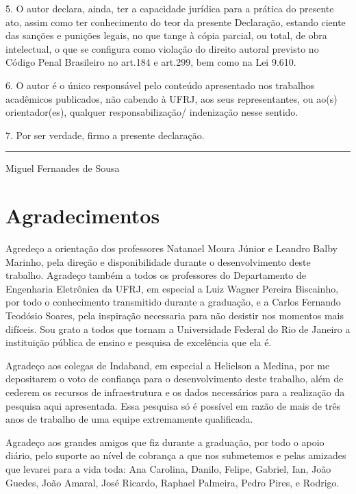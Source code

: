\documentclass[tcc,numbers]{coppe}
\begin{document}
5. O autor declara, ainda, ter a capacidade jurídica para a prática do presente
ato, assim como ter conhecimento do teor da presente Declaração, estando ciente
das sanções e punições legais, no que tange à cópia parcial, ou total, de obra
intelectual, o que se configura como violação do direito autoral previsto no
Código Penal Brasileiro no art.184 e art.299, bem como na Lei 9.610.

6. O autor é o único responsável pelo conteúdo apresentado nos trabalhos
acadêmicos publicados, não cabendo à UFRJ, aos seus representantes, ou ao(s)
orientador(es), qualquer responsabilização/ indenização nesse sentido.

7. Por ser verdade, firmo a presente declaração.

\vspace{4\baselineskip}

\noindent\hfill \rule{4in}{0.7pt}

\noindent\hfill Miguel Fernandes de Sousa
\newpage


  \dedication{Aos meus avós Aldinéa, Wilton e Henriqueta.}

  \chapter*{Agradecimentos}

  Agredeço a orientação dos professores Natanael Moura Júnior e Leandro Balby
  Marinho, pela direção e disponibilidade durante o desenvolvimento deste
  trabalho. Agradeço também a todos os professores do Departamento de Engenharia
  Eletrônica da UFRJ, em especial a Luiz Wagner Pereira Biscainho, por todo o
  conhecimento transmitido durante a graduação, e a Carlos Fernando Teodósio
  Soares, pela inspiração necessaria para não desistir nos momentos mais
  difíceis. Sou grato a todos que tornam a Universidade Federal do Rio de
  Janeiro a instituição pública de ensino e pesquisa de excelência que ela é.

  Agradeço aos colegas de Indaband, em especial a Helielson a Medina, por me
  depositarem o voto de confiança para o desenvolvimento deste trabalho, além de
  cederem os recursos de infraestrutura e os dados necessários para a realização
  da pesquisa aqui apresentada. Essa pesquisa só é possível em razão de mais
  de três anos de trabalho de uma equipe extremamente qualificada.

  Agradeço aos grandes amigos que fiz durante a graduação, por todo o apoio
  diário, pelo suporte ao nível de cobrança a que nos submetemos e pelas
  amizades que levarei para a vida toda: Ana Carolina, Danilo, Felipe, Gabriel,
  Ian, João Guedes, João Amaral, José Ricardo, Raphael Palmeira, Pedro Pires, e
  Rodrigo.
\end{document}
